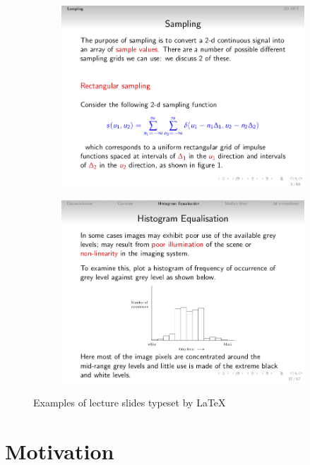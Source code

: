 \begin{figure}[!htb]
    \centering
    \begin{subfigure}{.49\textwidth}
        \includegraphics[width=\textwidth]{slide1.jpg}
    \end{subfigure}%
    \begin{subfigure}{.49\textwidth}
        \includegraphics[width=\textwidth]{slide2.jpg}
    \end{subfigure}
    \caption{Examples of lecture slides typeset by \LaTeX}
    \label{fig:intro-example-slides}
\end{figure}


\section{Motivation}

